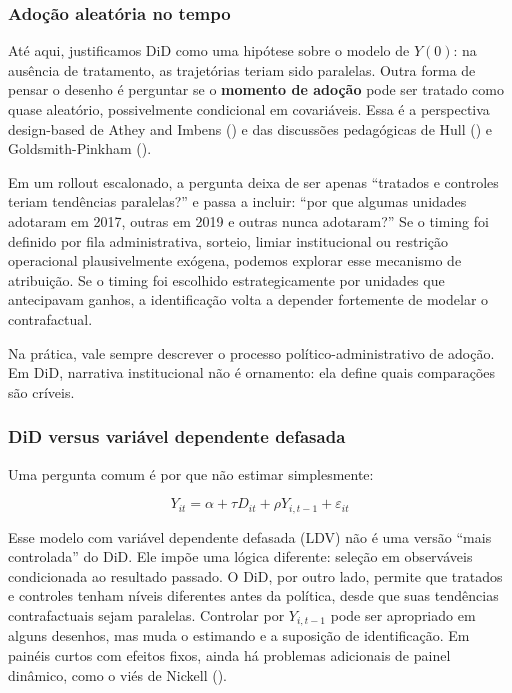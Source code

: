 \documentclass[
]{article}
\begin{document}
\subsubsection{Adoção aleatória no tempo}\label{adouxe7uxe3o-aleatuxf3ria-no-tempo}

Até aqui, justificamos DiD como uma hipótese sobre o modelo de \(Y(0)\): na ausência de tratamento, as trajetórias teriam sido paralelas. Outra forma de pensar o desenho é perguntar se o \textbf{momento de adoção} pode ser tratado como quase aleatório, possivelmente condicional em covariáveis. Essa é a perspectiva design-based de Athey and Imbens () e das discussões pedagógicas de Hull () e Goldsmith-Pinkham ().

Em um rollout escalonado, a pergunta deixa de ser apenas ``tratados e controles teriam tendências paralelas?'' e passa a incluir: ``por que algumas unidades adotaram em 2017, outras em 2019 e outras nunca adotaram?'' Se o timing foi definido por fila administrativa, sorteio, limiar institucional ou restrição operacional plausivelmente exógena, podemos explorar esse mecanismo de atribuição. Se o timing foi escolhido estrategicamente por unidades que antecipavam ganhos, a identificação volta a depender fortemente de modelar o contrafactual.

Na prática, vale sempre descrever o processo político-administrativo de adoção. Em DiD, narrativa institucional não é ornamento: ela define quais comparações são críveis.

\subsubsection{DiD versus variável dependente defasada}\label{did-versus-variuxe1vel-dependente-defasada}

Uma pergunta comum é por que não estimar simplesmente:

\[
Y_{it} = \alpha + \tau D_{it} + \rho Y_{i,t-1} + \varepsilon_{it}
\]

Esse modelo com variável dependente defasada (LDV) não é uma versão ``mais controlada'' do DiD. Ele impõe uma lógica diferente: seleção em observáveis condicionada ao resultado passado. O DiD, por outro lado, permite que tratados e controles tenham níveis diferentes antes da política, desde que suas tendências contrafactuais sejam paralelas. Controlar por \(Y_{i,t-1}\) pode ser apropriado em alguns desenhos, mas muda o estimando e a suposição de identificação. Em painéis curtos com efeitos fixos, ainda há problemas adicionais de painel dinâmico, como o viés de Nickell ().
\end{document}
